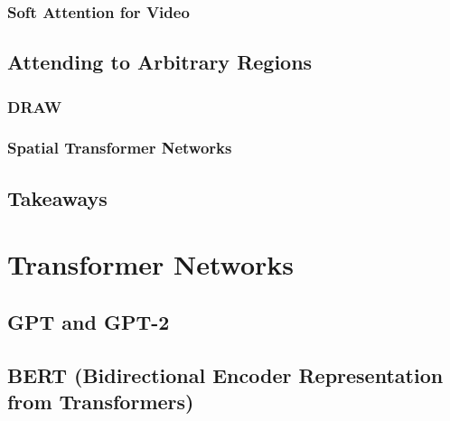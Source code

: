 			\subsubsection{Soft Attention for Video} %

		\subsection{Attending to Arbitrary Regions} %

			\subsubsection{DRAW} %

			\subsubsection{Spatial Transformer Networks} %

		\subsection{Takeaways} %

	\section{Transformer Networks} %

		\subsection{GPT and GPT-2} %

		\subsection{BERT (Bidirectional Encoder Representation from Transformers)} %
